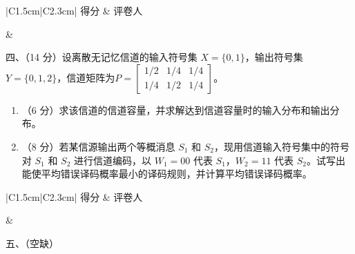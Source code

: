 \documentclass[UTF8,a4paper,12pt]{ctexart}
\begin{document}
\noindent
\begin{minipage}[t]{0.26\textwidth}
\renewcommand{\arraystretch}{1.5}
\begin{tabular}{|C{1.5cm}|C{2.3cm}|}
\hline
得分 & 评卷人 \\
\hline
\rule{0pt}{0.8cm}&  \\
\hline
\end{tabular}
\end{minipage}
\hspace{0.02\textwidth}
\begin{minipage}[t]{0.68\textwidth}
\vspace{0.25cm}
{\heiti 四、（14 分）}设离散无记忆信道的输入符号集
$X=\{0,1\}$，输出符号集 $Y=\{0,1,2\}$，信道矩阵为$P=
\begin{bmatrix}
1/2 & 1/4 & 1/4\\[0.4em]
1/4 & 1/2 & 1/4
\end{bmatrix}
$。
\end{minipage}
\vspace{0.3em}
\begin{enumerate}[label=\arabic*., leftmargin=2em]
\item （6 分）求该信道的信道容量，并求解达到信道容量时的输入分布和输出分布。
\item （8 分）若某信源输出两个等概消息 $S_1$ 和 $S_2$，现用信道输入符号集中的符号对 $S_1$ 和 $S_2$ 进行信道编码，以 $W_1=00$ 代表 $S_1$，$W_2=11$ 代表 $S_2$。试写出能使平均错误译码概率最小的译码规则，并计算平均错误译码概率。
\end{enumerate}
\newpage

\noindent
\begin{minipage}[t]{0.26\textwidth}
\renewcommand{\arraystretch}{1.5}
\begin{tabular}{|C{1.5cm}|C{2.3cm}|}
\hline
得分 & 评卷人 \\
\hline
\rule{0pt}{0.8cm}&  \\
\hline
\end{tabular}
\end{minipage}
\hspace{0.02\textwidth}
\begin{minipage}[t]{0.68\textwidth}
\vspace{0.85cm}
{\heiti 五、（空缺）}
\end{minipage}
\end{document}
